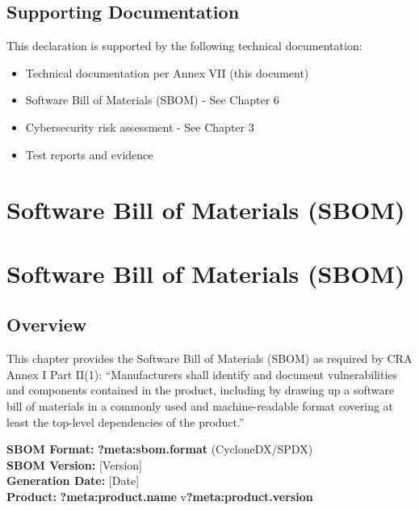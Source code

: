 \documentclass[
  11 pt,
  a4paper,
  table]{report}
\providecommand{\tightlist}{%
  \setlength{\itemsep}{0pt}\setlength{\parskip}{0pt}}\usepackage{longtable,booktabs,array}
\begin{document}
\section{Supporting Documentation}\label{supporting-documentation}

This declaration is supported by the following technical documentation:

\begin{itemize}
\tightlist
\item
  Technical documentation per Annex VII (this document)
\item
  Software Bill of Materials (SBOM) - See Chapter 6
\item
  Cybersecurity risk assessment - See Chapter 3
\item
  Test reports and evidence
\end{itemize}


\chapter{Software Bill of Materials
(SBOM)}\label{software-bill-of-materials-sbom}


\chapter{Software Bill of Materials
(SBOM)}\label{software-bill-of-materials-sbom-1}

\section{Overview}\label{overview}

This chapter provides the Software Bill of Materials (SBOM) as required
by CRA Annex I Part II(1): ``Manufacturers shall identify and document
vulnerabilities and components contained in the product, including by
drawing up a software bill of materials in a commonly used and
machine-readable format covering at least the top-level dependencies of
the product.''

\textbf{SBOM Format:} \textbf{?meta:sbom.format} (CycloneDX/SPDX)\\
\textbf{SBOM Version:} {[}Version{]}\\
\textbf{Generation Date:} {[}Date{]}\\
\textbf{Product:} \textbf{?meta:product.name}
v\textbf{?meta:product.version}
\end{document}

